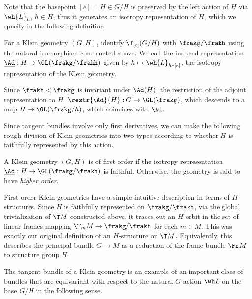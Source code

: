 Note that the basepoint $[e]=H\in G\slash H$ is preserved by the left action of $H$ via $\wh{L}_h$, $h\in H$, thus it generates an isotropy representation of $H$, which we specify in the following definition.

\begin{defn}
    For a Klein geometry $(G,H)$, identify $\T_{[e]}(G\slash H)$ with $\frakg\slash\frakh$ using the natural isomorphism constructed above. We call the induced representation $\underline{\Ad}:H\to \GL(\frakg\slash\frakh)$ given by $h\mapsto \wh{L}_{h\ast [e]}$, the isotropy representation of the Klein geometry.

    Since $\frakh<\frakg$ is invariant under $\Ad(H)$, the restriction of the adjoint representation to $H$, $\restr{\Ad}{H}:G\to \GL(\frakg)$, which descends to a map $H\to \GL(\frakg\slash h)$, which coincides with $\underline{\Ad}$.
\end{defn}

Since tangent bundles involve only first derivatives, we can make the following rough division of Klein geometries into two types according to whether $H$ is faithfully represented by this action.

\begin{defn}
    A Klein geometry $(G,H)$ is of first order if the isotropy representation $\underline{\Ad}:H\to \GL(\frakg\slash\frakh)$ is faithful. Otherwise, the geometry is said to have \emph{higher order}.
\end{defn}

\begin{rem}
    First order Klein geometries have a simple intuitive description in terms of $H$-structures. Since $H$ is faithfully represented on $\frakg\slash\frakh$, via the global trivialization of $\T M$ constructed above, it traces out an $H$-orbit in the set of linear frames mapping $\T_mM\to \frakg\slash\frakh$ for each $m\in M$. This was exactly our original definition of an $H$-structure on $\T M$. Equivalently, this describes the principal bundle $G\to M$ as a reduction of the frame bundle $\Fr M$ to structure group $H$.
\end{rem}

The tangent bundle of a Klein geometry is an example of an important class of bundles that are equivariant with respect to the natural $G$-action $\wh L$ on the base $G\slash H$ in the following sense.


